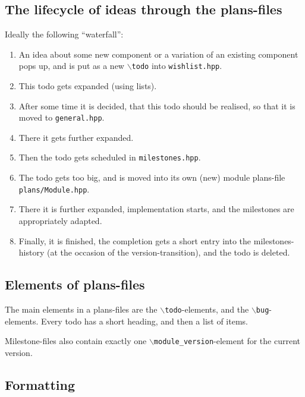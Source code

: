 \documentclass{book}
\newcommand{\filename}[1]{\texttt{#1}}
\begin{document}
\subsection{The lifecycle of ideas through the plans-files}
\label{sec:DoxygenPlansflow}

Ideally the following ``waterfall'':
\begin{enumerate}
\item An idea about some new component or a variation of an existing component pops up, and is put as a new \texttt{$\backslash$todo} into \filename{wishlist.hpp}.
\item This todo gets expanded (using lists).
\item After some time it is decided, that this todo should be realised, so that it is moved to \filename{general.hpp}.
\item There it gets further expanded.
\item Then the todo gets scheduled in \filename{milestones.hpp}.
\item The todo gets too big, and is moved into its own (new) module plans-file \filename{plans/Module.hpp}.
\item There it is further expanded, implementation starts, and the milestones are appropriately adapted.
\item Finally, it is finished, the completion gets a short entry into the milestones-history (at the occasion of the version-transition), and the todo is deleted.
\end{enumerate}


\subsection{Elements of plans-files}
\label{sec:DoxygenPlansElements}

The main elements in a plans-files are the \texttt{$\backslash$todo}-elements, and the \texttt{$\backslash$bug}-elements. Every todo has a short heading, and then a list of items.

Milestone-files also contain exactly one \texttt{$\backslash$module\_version}-element for the current version.


\subsection{Formatting}
\label{sec:DoxygenPlansFormatting}
\end{document}
